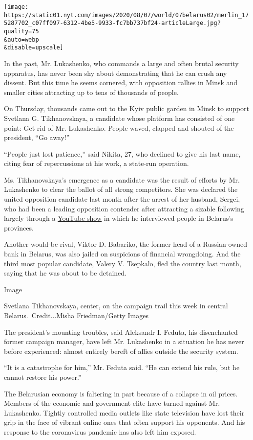 \texttt{[image: https://static01.nyt.com/images/2020/08/07/world/07belarus02/merlin\_175287702\_c07ff097-6312-4be5-9933-fc7bb737bf24-articleLarge.jpg?quality=75\\\&auto=webp\\\&disable=upscale]}

In the past, Mr. Lukashenko, who commands a large and often brutal
security apparatus, has never been shy about demonstrating that he can
crush any dissent. But this time he seems cornered, with opposition
rallies in Minsk and smaller cities attracting up to tens of thousands
of people.

On Thursday, thousands came out to the Kyiv public garden in Minsk to
support Svetlana G. Tikhanovskaya, a candidate whose platform has
consisted of one point: Get rid of Mr. Lukashenko. People waved, clapped
and shouted of the president, ``Go away!''

``People just lost patience,'' said Nikita, 27, who declined to give his
last name, citing fear of repercussions at his work, a state-run
operation.

Ms. Tikhanovskaya's emergence as a candidate was the result of efforts
by Mr. Lukashenko to clear the ballot of all strong competitors. She was
declared the united opposition candidate last month after the arrest of
her husband, Sergei, who had been a leading opposition contender after
attracting a sizable following largely through a
\href{https://www.youtube.com/channel/UCFPC7r3tWWXWzUIROLx46mg}{YouTube
show} in which he interviewed people in Belarus's provinces.

Another would-be rival, Viktor D. Babariko, the former head of a
Russian-owned bank in Belarus, was also jailed on suspicions of
financial wrongdoing. And the third most popular candidate, Valery V.
Tsepkalo, fled the country last month, saying that he was about to be
detained.

Image

Svetlana Tikhanovskaya, center, on the campaign trail this week in
central Belarus.~Credit...Misha Friedman/Getty Images

The president's mounting troubles, said Aleksandr I. Feduta, his
disenchanted former campaign manager, have left Mr. Lukashenko in a
situation he has never before experienced: almost entirely bereft of
allies outside the security system.

``It is a catastrophe for him,'' Mr. Feduta said. ``He can extend his
rule, but he cannot restore his power.''

The Belarusian economy is faltering in part because of a collapse in oil
prices. Members of the economic and government elite have turned against
Mr. Lukashenko. Tightly controlled media outlets like state television
have lost their grip in the face of vibrant online ones that often
support his opponents. And his response to the coronavirus pandemic has
also left him exposed.

